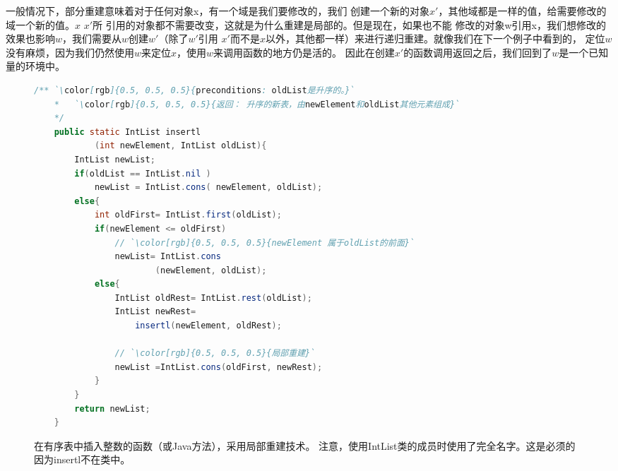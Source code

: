 一般情况下，部分重建意味着对于任何对象x，有一个域是我们要修改的，我们
创建一个新的对象$x'$，其他域都是一样的值，给需要修改的域一个新的值。$x$ $x'$所
引用的对象都不需要改变，这就是为什么重建是局部的。但是现在，如果也不能
修改的对象w引用x，我们想修改的效果也影响$w$，我们需要从$w$创建$w'$（除了$w'$引用
$x'$而不是$x$以外，其他都一样）来进行递归重建。就像我们在下一个例子中看到的，
定位$w$没有麻烦，因为我们仍然使用$w$来定位$x$，使用$w$来调用函数的地方仍是活的。
因此在创建$x'$的函数调用返回之后，我们回到了$w$是一个已知量的环境中。

\begin{figure*}[!t]
\begin{lstlisting}[language={Java},keywordstyle=\color{blue!70}, commentstyle=\color{red!50!green!50!blue!50}]
    /** `\color[rgb]{0.5, 0.5, 0.5}{preconditions: oldList是升序的。}`
    *   `\color[rgb]{0.5, 0.5, 0.5}{返回： 升序的新表，由newElement和oldList其他元素组成}`
    */
    public static IntList insertl
            (int newElement, IntList oldList){
        IntList newList;
        if(oldList == IntList.nil )
            newList = IntList.cons( newElement, oldList);
        else{
            int oldFirst= IntList.first(oldList);
            if(newElement <= oldFirst)
                // `\color[rgb]{0.5, 0.5, 0.5}{newElement 属于oldList的前面}`
                newList= IntList.cons
                        (newElement, oldList);
            else{
                IntList oldRest= IntList.rest(oldList);
                IntList newRest=
                    insertl(newElement, oldRest);

                // `\color[rgb]{0.5, 0.5, 0.5}{局部重建}`
                newList =IntList.cons(oldFirst, newRest);
            }
        }
        return newList;
    }
\end{lstlisting}

    \caption{在有序表中插入整数的函数（或Java方法），采用局部重建技术。
                注意，使用IntList类的成员时使用了完全名字。这是必须的
                因为insertl不在类中。}
    \label{Fig:PartialRebuild}
\end{figure*}

